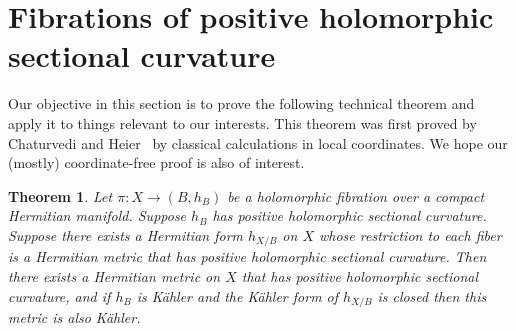 \documentclass[10pt,a4paper]{amsart}
\newtheorem{theo}{Theorem}[section]
\theoremstyle{definition}
\def\kahler{K\"ahler}
\begin{document}
\section{Fibrations of positive holomorphic sectional curvature}
\label{sec:grassmannian-bundles}

Our objective in this section is to prove the following technical theorem and apply it to things relevant to our interests.
This theorem was first proved by Chaturvedi and Heier~\cite[Theorem~1.1]{chaturvedi2020hermitian} by classical calculations in local coordinates.
We hope our (mostly) coordinate-free proof is also of interest.

\begin{theo}
\label{thm:holomorphic-sectional-positive}
Let $\pi : X \to (B,h_{B})$ be a holomorphic fibration over a compact Hermitian manifold.
Suppose $h_{B}$ has positive holomorphic sectional curvature.
Suppose there exists a Hermitian form $h_{X/B}$ on $X$ whose restriction to each fiber is a Hermitian metric that has positive holomorphic sectional curvature.
Then there exists a Hermitian metric on $X$ that has positive holomorphic sectional curvature, and if $h_{B}$ is \kahler{} and the \kahler{} form of $h_{X/B}$ is closed then this metric is also \kahler{}.
\end{theo}
\end{document}
